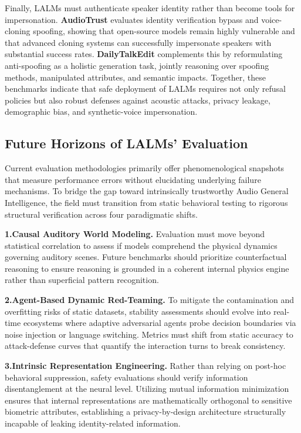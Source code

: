 Finally, LALMs must authenticate speaker identity rather than become tools for impersonation. \textbf{AudioTrust} \cite{li2025audiotrust} evaluates identity verification bypass and voice-cloning spoofing, showing that open-source models remain highly vulnerable and that advanced cloning systems can successfully impersonate speakers with substantial success rates. \textbf{DailyTalkEdit} \cite{xu2026holiantispoof} complements this by reformulating anti-spoofing as a holistic generation task, jointly reasoning over spoofing methods, manipulated attributes, and semantic impacts. Together, these benchmarks indicate that safe deployment of LALMs requires not only refusal policies but also robust defenses against acoustic attacks, privacy leakage, demographic bias, and synthetic-voice impersonation.
\subsection{Future Horizons of LALMs' Evaluation} \label{sec:5.4}

Current evaluation methodologies primarily offer phenomenological snapshots that measure performance errors without elucidating underlying failure mechanisms. To bridge the gap toward intrinsically trustworthy Audio General Intelligence, the field must transition from static behavioral testing to rigorous structural verification across four paradigmatic shifts.

\textbf{1.Causal Auditory World Modeling.}  Evaluation must move beyond statistical correlation to assess if models comprehend the physical dynamics governing auditory scenes. Future benchmarks should prioritize counterfactual reasoning to ensure reasoning is grounded in a coherent internal physics engine rather than superficial pattern recognition.

\textbf{2.Agent-Based Dynamic Red-Teaming.} To mitigate the contamination and overfitting risks of static datasets, stability assessments should evolve into real-time ecosystems where adaptive adversarial agents probe decision boundaries via noise injection or language switching. Metrics must shift from static accuracy to attack-defense curves that quantify the interaction turns to break consistency.

\textbf{3.Intrinsic Representation Engineering.} Rather than relying on post-hoc behavioral suppression, safety evaluations should verify information disentanglement at the neural level. Utilizing mutual information minimization ensures that internal representations are mathematically orthogonal to sensitive biometric attributes, establishing a privacy-by-design architecture structurally incapable of leaking identity-related information.

